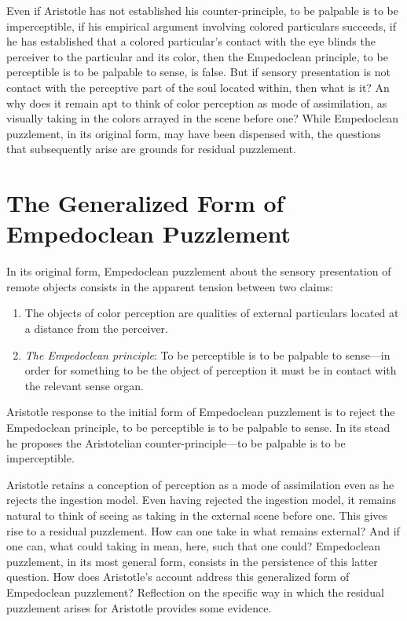 Even if Aristotle has not established his counter-principle, to be palpable is to be imperceptible, if his empirical argument involving colored particulars succeeds, if he has established that a colored particular's contact with the eye blinds the perceiver to the particular and its color, then the Empedoclean principle, to be perceptible is to be palpable to sense, is false. But if sensory presentation is not contact with the perceptive part of the soul located within, then what is it? An why does it remain apt to think of color perception as mode of assimilation, as visually taking in the colors arrayed in the scene before one? While Empedoclean puzzlement, in its original form, may have been dispensed with, the questions that subsequently arise are grounds for residual puzzlement.


\section{The Generalized Form of Empedoclean Puzzlement} %
\label{sec:the_generalized_form_of_empedoclean_puzzlement}

In its original form, Empedoclean puzzlement about the sensory presentation of remote objects consists in the apparent tension between two claims:
\begin{enumerate}[(1)]
    \item The objects of color perception are qualities of external particulars located at a distance from the perceiver.
    \item \emph{The Empedoclean principle}: To be perceptible is to be palpable to sense---in order for something to be the object of perception it must be in contact with the relevant sense organ.
\end{enumerate}
Aristotle response to the initial form of Empedoclean puzzlement is to reject the Empedoclean principle, to be perceptible is to be palpable to sense. In its stead he proposes the Aristotelian counter-principle---to be palpable is to be imperceptible. 

Aristotle retains a conception of perception as a mode of assimilation even as he rejects the ingestion model. Even having rejected the ingestion model, it remains natural to think of seeing as taking in the external scene before one. This gives rise to a residual puzzlement. How can one take in what remains external? And if one can, what could taking in mean, here, such that one could? Empedoclean puzzlement, in its most general form, consists in the persistence of this latter question. How does Aristotle's account address this generalized form of Empedoclean puzzlement? Reflection on the specific way in which the residual puzzlement arises for Aristotle provides some evidence.

